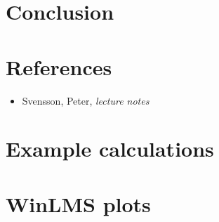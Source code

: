 \documentclass{article}
\begin{document}
\section{Conclusion}

\newpage
\section*{References}
\footnotesize{
\begin{itemize}
\item Svensson, Peter, \textit{lecture notes}
\end{itemize}
}

\newpage
\appendix
\section{Example calculations}



\section{WinLMS plots}
\end{document}
